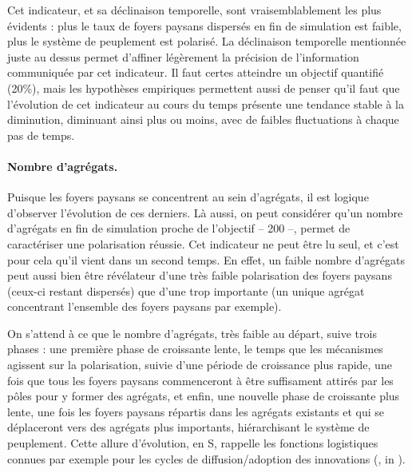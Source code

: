 Cet indicateur, et sa déclinaison temporelle, sont vraisemblablement les plus évidents :
plus le taux de foyers paysans dispersés en fin de simulation est faible, plus le système de peuplement est polarisé.
La \og déclinaison temporelle\fg{} mentionnée juste au dessus permet d'affiner légèrement la précision de l'information communiquée par cet indicateur.
Il faut certes atteindre un objectif quantifié (20\%), mais les hypothèses empiriques permettent aussi de penser qu'il faut que l'évolution de cet indicateur au cours du temps présente une tendance stable à la diminution, diminuant ainsi plus ou moins, avec de faibles fluctuations à chaque pas de temps.

\paragraph{Nombre d'agrégats.}

Puisque les foyers paysans se concentrent au sein d'agrégats, il est logique d'observer l'évolution de ces derniers.
Là aussi, on peut considérer qu'un nombre d'agrégats en fin de simulation proche de l'objectif -- 200 --, permet de caractériser une polarisation réussie.
Cet indicateur ne peut être lu seul, et c'est pour cela qu'il vient dans un second temps.
En effet, un faible nombre d'agrégats peut aussi bien être révélateur d'une très faible polarisation des foyers paysans (ceux-ci restant dispersés) que d'une trop importante (un unique agrégat concentrant l'ensemble des foyers paysans par exemple).

On s'attend à ce que le nombre d'agrégats, très faible au départ, suive trois phases :
une première phase de croissante lente, le temps que les mécanismes agissent sur la polarisation, suivie d'une période de croissance plus rapide, une fois que tous les foyers paysans commenceront à être suffisament attirés par les pôles pour y former des agrégats, et enfin, une nouvelle phase de croissante plus lente, une fois les foyers paysans répartis dans les agrégats existants et qui se déplaceront vers des agrégats plus importants, hiérarchisant le système de peuplement.
Cette allure d'évolution, en \og S\fg{}, rappelle les fonctions logistiques connues par exemple pour les cycles de diffusion/adoption des innovations (\cite{hagerstrand1952propagation}, in \cite[28]{daude_modelisation_2002}).

